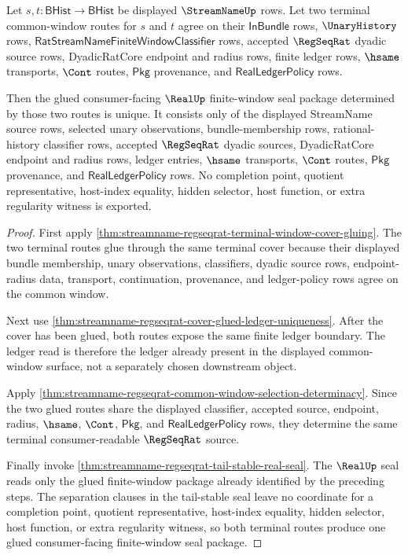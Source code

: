 \begin{theorem}
\label{thm:streamname-regseqrat-glued-real-seal-uniqueness}
Let $s,t:\mathsf{BHist}\to\mathsf{BHist}$ be displayed $\StreamNameUp$ rows.
Let two terminal common-window routes for $s$ and $t$ agree on their
$\mathsf{InBundle}$ rows, $\UnaryHistory$ rows,
$\mathsf{RatStreamNameFiniteWindowClassifier}$ rows, accepted $\RegSeqRat$
dyadic source rows, DyadicRatCore endpoint and radius rows, finite ledger
rows, $\hsame$ transports, $\Cont$ routes, $\mathsf{Pkg}$ provenance, and
$\mathsf{RealLedgerPolicy}$ rows.

Then the glued consumer-facing $\RealUp$ finite-window seal package determined
by those two routes is unique. It consists only of the displayed StreamName
source rows, selected unary observations, bundle-membership rows,
rational-history classifier rows, accepted $\RegSeqRat$ dyadic sources,
DyadicRatCore endpoint and radius rows, ledger entries, $\hsame$ transports,
$\Cont$ routes, $\mathsf{Pkg}$ provenance, and $\mathsf{RealLedgerPolicy}$
rows. No completion point, quotient representative, host-index equality,
hidden selector, host function, or extra regularity witness is exported.
\end{theorem}
\begin{proof}
First apply
\autoref{thm:streamname-regseqrat-terminal-window-cover-gluing}. The two
terminal routes glue through the same terminal cover because their displayed
bundle membership, unary observations, classifiers, dyadic source rows,
endpoint-radius data, transport, continuation, provenance, and ledger-policy
rows agree on the common window.

Next use
\autoref{thm:streamname-regseqrat-cover-glued-ledger-uniqueness}. After the
cover has been glued, both routes expose the same finite ledger boundary. The
ledger read is therefore the ledger already present in the displayed
common-window surface, not a separately chosen downstream object.

Apply
\autoref{thm:streamname-regseqrat-common-window-selection-determinacy}. Since
the two glued routes share the displayed classifier, accepted source, endpoint,
radius, $\hsame$, $\Cont$, $\mathsf{Pkg}$, and $\mathsf{RealLedgerPolicy}$
rows, they determine the same terminal consumer-readable $\RegSeqRat$ source.

Finally invoke
\autoref{thm:streamname-regseqrat-tail-stable-real-seal}. The $\RealUp$ seal
reads only the glued finite-window package already identified by the preceding
steps. The separation clauses in the tail-stable seal leave no coordinate for
a completion point, quotient representative, host-index equality, hidden
selector, host function, or extra regularity witness, so both terminal routes
produce one glued consumer-facing finite-window seal package.
\end{proof}

